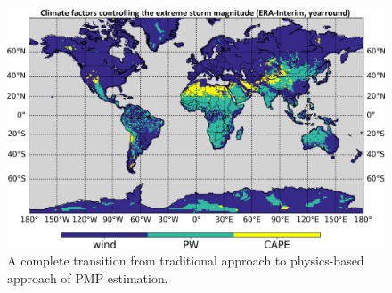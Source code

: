 \begin{figure}[htbp]
	\centering
	\includegraphics[width=\linewidth]{pics/ch6/fig1.png}
	\caption{A complete transition from traditional approach to physics-based approach of PMP estimation.}
	\label{fig:6-1}
\end{figure}